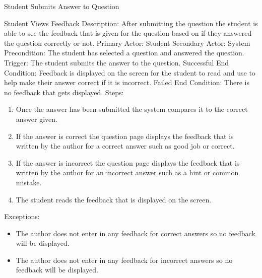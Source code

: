     
    
    \begin{section}{Student Submits Answer to Question}
    
    \end{section}
    

    
    \begin{section}{Student Views Feedback}
        Description: After submitting the question the student is able to see the feedback that is given for the 
        question based on if they answered the question correctly or not. \newline
        Primary Actor: Student \newline
        Secondary Actor: System \newline
        Precondition: The student has selected a question and answered the question. \newline
        Trigger: The student submits the answer to the question. \newline
        Successful End Condition: Feedback is displayed on the screen for the student 
        to read and use to help make their answer correct if it is incorrect. \newline
        Failed End Condition: There is no feedback that gets displayed. \newline
        \newline
        Steps:
        \begin{enumerate}
            \item{Once the answer has been submitted the system compares it to the correct answer given.}
            \item{If the answer is correct the question page displays the feedback that is 
            written by the author for a correct answer such as good job or correct.}
            \item{If the answer is incorrect the question page displays the feedback that is 
            written by the author for an incorrect answer such as a hint or common mistake.}
            \item{The student reads the feedback that is displayed on the screen.}
        \end{enumerate}
        Exceptions:
        \begin{itemize}
            \item{The author does not enter in any feedback for correct answers so no feedback will be displayed.}
            \item{The author does not enter in any feedback for incorrect answers so no feedback will be displayed.}
        \end{itemize}
    \end{section}
        
